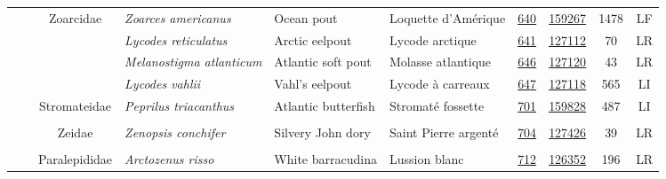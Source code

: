 \documentclass[12pt]{article}\usepackage[]{graphicx}\usepackage[]{color}
\begin{document}
\begin{landscapepage}
\begin{longtable}[t]{ccc>{\centering\arraybackslash}p{3cm}>{\centering\arraybackslash}p{3cm}>{\centering\arraybackslash}p{3cm}>{}c>{}ccc}
\hspace{1em}\hspace{1em} &  & Zoarcidae & \em{Zoarces americanus} & Ocean pout & Loquette d'Amérique & \href{#sec:640}{640} & \href{http://www.marinespecies.org/aphia.php?p=taxdetails&id=159267}{159267} & 1478 & LF\\
\nopagebreak
\hspace{1em}\hspace{1em} &  &  & \em{Lycodes reticulatus} & Arctic eelpout & Lycode arctique & \href{#sec:641}{641} & \href{http://www.marinespecies.org/aphia.php?p=taxdetails&id=127112}{127112} & 70 & LR\\
\nopagebreak
\hspace{1em}\hspace{1em} &  &  & \em{Melanostigma atlanticum} & Atlantic soft pout & Molasse atlantique & \href{#sec:646}{646} & \href{http://www.marinespecies.org/aphia.php?p=taxdetails&id=127120}{127120} & 43 & LR\\
\nopagebreak
\hspace{1em}\hspace{1em} &  &  & \em{Lycodes vahlii} & Vahl's eelpout & Lycode à carreaux & \href{#sec:647}{647} & \href{http://www.marinespecies.org/aphia.php?p=taxdetails&id=127118}{127118} & 565 & LI\\
\nopagebreak
\hspace{1em}\hspace{1em} &  & Stromateidae & \em{Peprilus triacanthus} & Atlantic butterfish & Stromaté fossette & \href{#sec:701}{701} & \href{http://www.marinespecies.org/aphia.php?p=taxdetails&id=159828}{159828} & 487 & LI\\
\nopagebreak
\addlinespace[0.3em]
\\
\hspace{1em}\hspace{1em} &  & Zeidae & \em{Zenopsis conchifer} & Silvery John dory & Saint Pierre argenté & \href{#sec:704}{704} & \href{http://www.marinespecies.org/aphia.php?p=taxdetails&id=127426}{127426} & 39 & LR\\
\nopagebreak
\addlinespace[0.3em]
\\
\hspace{1em}\hspace{1em} &  & Paralepididae & \em{Arctozenus risso} & White barracudina & Lussion blanc & \href{#sec:712}{712} & \href{http://www.marinespecies.org/aphia.php?p=taxdetails&id=126352}{126352} & 196 & LR\\

\end{longtable}
\end{landscapepage}
\end{document}
